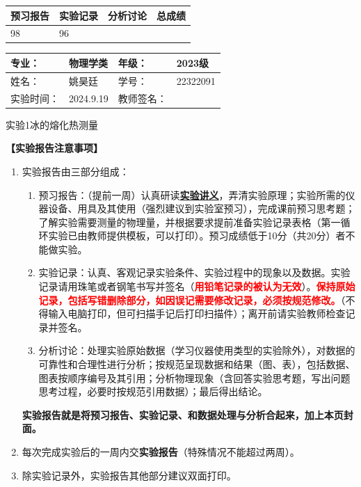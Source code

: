 \documentclass[dvipsnames, svgnames,a4paper,11pt]{article}
\begin{document}
\begin{table}
	\renewcommand\arraystretch{1.7}
	\begin{tabularx}{\textwidth}{
		|X|X|X|X
		|X|X|X|X|}
	\hline
	\multicolumn{2}{|c|}{预习报告}&\multicolumn{2}{|c|}{实验记录}&\multicolumn{2}{|c|}{分析讨论}&\multicolumn{2}{|c|}{总成绩}\\
	\hline
	98& &96 & & & & & \\
	\hline
	\end{tabularx}
\end{table}


\begin{table}
	\renewcommand\arraystretch{1.7}
	\begin{tabularx}{\textwidth}{|X|X|X|X|}
	\hline
	专业：& 物理学类 &年级：& 2023级\\
	\hline
	姓名：& 姚昊廷  & 学号：&22322091\\
	\hline
	实验时间：& 2024.9.19& 教师签名：& \\
	\hline
	\end{tabularx}
\end{table}

\begin{center}
	\LARGE 实验1\hspace{0.3cm}冰的熔化热测量
\end{center}

\textbf{【实验报告注意事项】}
\begin{enumerate}
	\item 实验报告由三部分组成：
	\begin{enumerate}
		\item 预习报告：（提前一周）认真研读\underline{\textbf{实验讲义}}，弄清实验原理；实验所需的仪器设备、用具及其使用（强烈建议到实验室预习），完成课前预习思考题；了解实验需要测量的物理量，并根据要求提前准备实验记录表格（第一循环实验已由教师提供模板，可以打印）。预习成绩低于10分（共20分）者不能做实验。
	    \item 实验记录：认真、客观记录实验条件、实验过程中的现象以及数据。实验记录请用珠笔或者钢笔书写并签名（\textcolor{red}{\textbf{用铅笔记录的被认为无效}}）。\textcolor{red}{\textbf{保持原始记录，包括写错删除部分，如因误记需要修改记录，必须按规范修改。}}（不得输入电脑打印，但可扫描手记后打印扫描件）；离开前请实验教师检查记录并签名。
	    \item 分析讨论：处理实验原始数据（学习仪器使用类型的实验除外），对数据的可靠性和合理性进行分析；按规范呈现数据和结果（图、表），包括数据、图表按顺序编号及其引用；分析物理现象（含回答实验思考题，写出问题思考过程，必要时按规范引用数据）；最后得出结论。
	\end{enumerate}
	\textbf{实验报告就是将预习报告、实验记录、和数据处理与分析合起来，加上本页封面。}
	\item 每次完成实验后的一周内交\textbf{实验报告}（特殊情况不能超过两周）。
	\item 除实验记录外，实验报告其他部分建议双面打印。
\end{enumerate}
\end{document}
